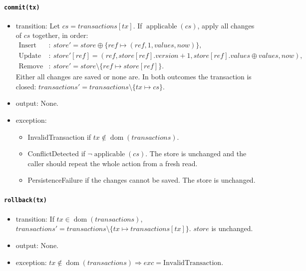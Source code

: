 \documentclass[12pt, titlepage]{article}
\begin{document}
\paragraph{\texttt{commit(tx)}}
\begin{itemize}
    \item transition: Let $cs=\mathit{transactions}[tx]$. If $\operatorname{applicable}(cs)$, apply all changes of $cs$ together, in order:
    \[
        \begin{aligned}
            \text{Insert}&:\ \mathit{store}'=\mathit{store}\oplus\{ref\mapsto(ref,1,values,\mathit{now})\},\\
            \text{Update}&:\ \mathit{store}'[ref]=(ref,\mathit{store}[ref].version+1,\mathit{store}[ref].values\oplus values,\mathit{now}),\\
            \text{Remove}&:\ \mathit{store}'=\mathit{store}\setminus\{ref\mapsto\mathit{store}[ref]\}.
        \end{aligned}
    \]
    Either all changes are saved or none are. In both outcomes the transaction is closed:
    $\mathit{transactions}'=\mathit{transactions}\setminus\{tx\mapsto cs\}$.
    \item output: None.
    \item exception:
    \begin{itemize}
        \item InvalidTransaction if $tx\notin\operatorname{dom}(\mathit{transactions})$.
        \item ConflictDetected if $\neg\operatorname{applicable}(cs)$. The store is unchanged and the caller
        should repeat the whole action from a fresh read.
        \item PersistenceFailure if the changes cannot be saved. The store is unchanged.
    \end{itemize}
\end{itemize}

\paragraph{\texttt{rollback(tx)}}
\begin{itemize}
    \item transition: If $tx\in\operatorname{dom}(\mathit{transactions})$, $\mathit{transactions}'=\mathit{transactions}\setminus\{tx\mapsto\mathit{transactions}[tx]\}$. $\mathit{store}$ is unchanged.
    \item output: None.
    \item exception: $tx\notin\operatorname{dom}(\mathit{transactions})\Rightarrow exc=\text{InvalidTransaction}$.
\end{itemize}
\end{document}
